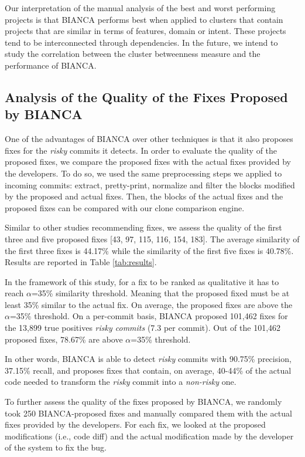 \documentclass[12pt]{report}
\begin{document}
Our interpretation of the manual analysis of the best and worst
performing projects is that BIANCA performs best when applied to
clusters that contain projects that are similar in terms of features,
domain or intent. These projects tend to be interconnected through
dependencies. In the future, we intend to study the correlation between
the cluster betweenness measure and the performance of BIANCA.

\subsection{Analysis of the Quality of the Fixes Proposed by
BIANCA}\label{analysis-of-the-quality-of-the-fixes-proposed-by-bianca}

One of the advantages of BIANCA over other techniques is that it also
proposes fixes for the \emph{risky} commits it detects. In order to
evaluate the quality of the proposed fixes, we compare the proposed
fixes with the actual fixes provided by the developers. To do so, we
used the same preprocessing steps we applied to incoming commits:
extract, pretty-print, normalize and filter the blocks modified by the
proposed and actual fixes. Then, the blocks of the actual fixes and the
proposed fixes can be compared with our clone comparison engine.

Similar to other studies recommending fixes, we assess the quality of
the first three and five proposed fixes {[}43, 97, 115, 116, 154,
183{]}. The average similarity of the first three fixes is 44.17\% while
the similarity of the first five fixes is 40.78\%. Results are reported
in Table \ref{tab:results}.

In the framework of this study, for a fix to be ranked as qualitative it
has to reach \(\alpha\)=35\% similarity threshold. Meaning that the
proposed fixed must be at least 35\% similar to the actual fix. On
average, the proposed fixes are above the \(\alpha\)=35\% threshold. On
a per-commit basis, BIANCA proposed 101,462 fixes for the 13,899 true
positives \emph{risky commits} (7.3 per commit). Out of the 101,462
proposed fixes, 78.67\% are above \(\alpha\)=35\% threshold.

In other words, BIANCA is able to detect \emph{risky} commits with
90.75\% precision, 37.15\% recall, and proposes fixes that contain, on
average, 40-44\% of the actual code needed to transform the \emph{risky}
commit into a \emph{non-risky} one.

To further assess the quality of the fixes proposed by BIANCA, we
randomly took 250 BIANCA-proposed fixes and manually compared them with
the actual fixes provided by the developers. For each fix, we looked at
the proposed modifications (i.e., code diff) and the actual modification
made by the developer of the system to fix the bug.
\end{document}
